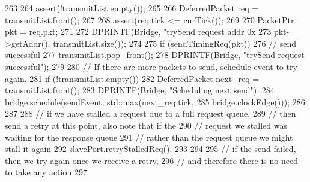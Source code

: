 \begin{DoxyCode}
263 {
264     assert(!transmitList.empty());
265 
266     DeferredPacket req = transmitList.front();
267 
268     assert(req.tick <= curTick());
269 
270     PacketPtr pkt = req.pkt;
271 
272     DPRINTF(Bridge, "trySend request addr 0x%
273             pkt->getAddr(), transmitList.size());
274 
275     if (sendTimingReq(pkt)) {
276         // send successful
277         transmitList.pop_front();
278         DPRINTF(Bridge, "trySend request successful\n");
279 
280         // If there are more packets to send, schedule event to try again.
281         if (!transmitList.empty()) {
282             DeferredPacket next_req = transmitList.front();
283             DPRINTF(Bridge, "Scheduling next send\n");
284             bridge.schedule(sendEvent, std::max(next_req.tick,
285                                                 bridge.clockEdge()));
286         }
287 
288         // if we have stalled a request due to a full request queue,
289         // then send a retry at this point, also note that if the
290         // request we stalled was waiting for the response queue
291         // rather than the request queue we might stall it again
292         slavePort.retryStalledReq();
293     }
294 
295     // if the send failed, then we try again once we receive a retry,
296     // and therefore there is no need to take any action
297 }
\end{DoxyCode}



